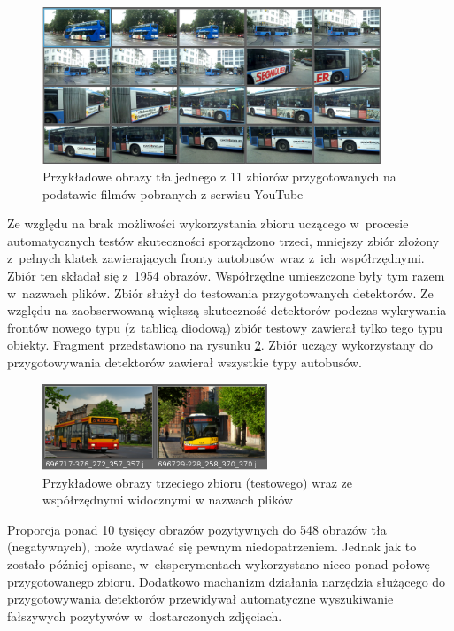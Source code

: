 \begin{figure}[!h]
	\centering
	\includegraphics[width=0.9\textwidth]{img/exp_first_background_sample}
	\caption{Przykładowe obrazy tła jednego z 11 zbiorów
		przygotowanych na podstawie
		filmów pobranych z serwisu YouTube}
	\label{fig:exp_first_background_sample}
\end{figure}

Ze względu na brak możliwości wykorzystania zbioru uczącego
w~procesie automatycznych testów skuteczności sporządzono trzeci,
mniejszy zbiór złożony z~pełnych klatek zawierających
fronty autobusów wraz z~ich współrzędnymi. Zbiór ten składał się
z~1954 obrazów. Współrzędne umieszczone były tym razem w~nazwach
plików. Zbiór służył do testowania przygotowanych detektorów. 
Ze względu na zaobserwowaną większą skuteczność detektorów podczas
wykrywania frontów nowego typu (z~tablicą diodową) zbiór testowy
zawierał tylko tego typu obiekty. Fragment przedstawiono na rysunku
\ref{fig:exp_third_whole_sample}. Zbiór uczący wykorzystany do
przygotowywania detektorów zawierał wszystkie typy autobusów.

\begin{figure}[!h]
	\centering
	\includegraphics[width=0.6\textwidth]{img/exp_third_whole_sample}
	\caption{Przykładowe obrazy trzeciego zbioru (testowego) 
		wraz ze współrzędnymi widocznymi w nazwach plików}
	\label{fig:exp_third_whole_sample}
\end{figure}

Proporcja ponad 10 tysięcy obrazów pozytywnych do 548 obrazów tła (negatywnych), 
może wydawać się pewnym niedopatrzeniem. Jednak jak to zostało później opisane,
w~eksperymentach wykorzystano nieco ponad połowę przygotowanego zbioru. Dodatkowo
machanizm działania narzędzia służącego do przygotowywania detektorów przewidywał
automatyczne wyszukiwanie fałszywych pozytywów w~dostarczonych zdjęciach. 

